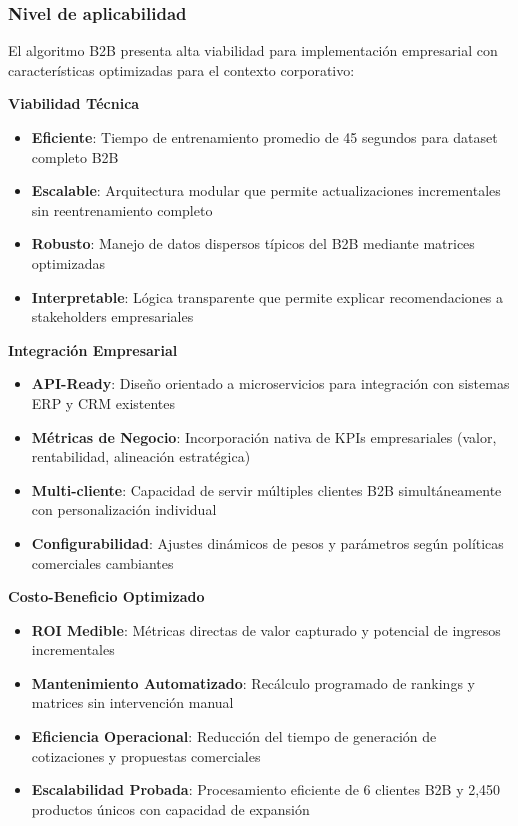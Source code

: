 \documentclass[twocolumn]{article}
\begin{document}
\subsubsection{Nivel de aplicabilidad}

El algoritmo B2B presenta alta viabilidad para implementación empresarial con características optimizadas para el contexto corporativo:

\textbf{Viabilidad Técnica}
\begin{itemize}
    \item \textbf{Eficiente}: Tiempo de entrenamiento promedio de 45 segundos para dataset completo B2B
    \item \textbf{Escalable}: Arquitectura modular que permite actualizaciones incrementales sin reentrenamiento completo
    \item \textbf{Robusto}: Manejo de datos dispersos típicos del B2B mediante matrices optimizadas
    \item \textbf{Interpretable}: Lógica transparente que permite explicar recomendaciones a stakeholders empresariales
\end{itemize}

\textbf{Integración Empresarial}
\begin{itemize}
    \item \textbf{API-Ready}: Diseño orientado a microservicios para integración con sistemas ERP y CRM existentes
    \item \textbf{Métricas de Negocio}: Incorporación nativa de KPIs empresariales (valor, rentabilidad, alineación estratégica)
    \item \textbf{Multi-cliente}: Capacidad de servir múltiples clientes B2B simultáneamente con personalización individual
    \item \textbf{Configurabilidad}: Ajustes dinámicos de pesos y parámetros según políticas comerciales cambiantes
\end{itemize}

\textbf{Costo-Beneficio Optimizado}
\begin{itemize}
    \item \textbf{ROI Medible}: Métricas directas de valor capturado y potencial de ingresos incrementales
    \item \textbf{Mantenimiento Automatizado}: Recálculo programado de rankings y matrices sin intervención manual
    \item \textbf{Eficiencia Operacional}: Reducción del tiempo de generación de cotizaciones y propuestas comerciales
    \item \textbf{Escalabilidad Probada}: Procesamiento eficiente de 6 clientes B2B y 2,450 productos únicos con capacidad de expansión
\end{itemize}
\end{document}
